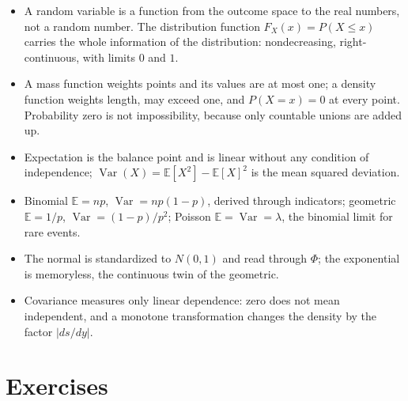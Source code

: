 \begin{ringkasan}
\begin{itemize}
\item A random variable is a function from the outcome space to the real numbers, not a random
      number. The distribution function $F_X(x)=P(X\le x)$ carries the whole information of the distribution:
      nondecreasing, right-continuous, with limits $0$ and $1$.
\item A mass function weights points and its values are at most one; a density function
      weights length, may exceed one, and $P(X=x)=0$ at every point. Probability
      zero is not impossibility, because only countable unions are added up.
\item Expectation is the balance point and is linear without any condition of independence;
      $\operatorname{Var}(X)=\mathbb{E}[X^2]-\mathbb{E}[X]^2$ is the mean squared
      deviation.
\item Binomial $\mathbb{E}=np$, $\operatorname{Var}=np(1-p)$, derived through
      indicators; geometric $\mathbb{E}=1/p$, $\operatorname{Var}=(1-p)/p^2$; Poisson
      $\mathbb{E}=\operatorname{Var}=\lambda$, the binomial limit for rare events.
\item The normal is standardized to $N(0,1)$ and read through $\Phi$; the exponential is
      memoryless, the continuous twin of the geometric.
\item Covariance measures only linear dependence: zero does not mean independent, and a
      monotone transformation changes the density by the factor $|ds/dy|$.
\end{itemize}
\end{ringkasan}

\section{Exercises}

